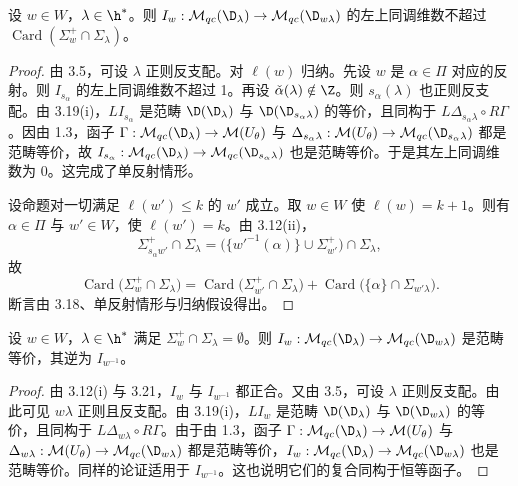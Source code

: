 \begin{theorem}\label{thm:03.3.21}
设 $w\in W$，$\lambda\in\h^*$。则 $I_w:\mathcal{M}_{qc}(\D_\lambda)\to\mathcal{M}_{qc}(\D_{w\lambda})$ 的左上同调维数不超过 $\operatorname{Card}(\Sigma^+_w\cap\Sigma_\lambda)$。
\end{theorem}

\begin{proof}
由 3.5，可设 $\lambda$ 正则反支配。对 $\ell(w)$ 归纳。先设 $w$ 是 $\alpha\in\Pi$ 对应的反射。则 $I_{s_\alpha}$ 的左上同调维数不超过 1。再设 $\check\alpha(\lambda)\notin\Z$。则 $s_\alpha(\lambda)$ 也正则反支配。由 3.19(i)，$LI_{s_\alpha}$ 是范畴 $\D(\D_\lambda)$ 与 $\D(\D_{s_\alpha\lambda})$ 的等价，且同构于 $L\Delta_{s_\alpha\lambda}\circ R\Gamma$。因由 1.3，函子 $\Gamma:\mathcal{M}_{qc}(\D_\lambda)\to\mathcal{M}(U_\theta)$ 与 $\Delta_{s_\alpha\lambda}:\mathcal{M}(U_\theta)\to\mathcal{M}_{qc}(\D_{s_\alpha\lambda})$ 都是范畴等价，故 $I_{s_\alpha}:\mathcal{M}_{qc}(\D_\lambda)\to\mathcal{M}_{qc}(\D_{s_\alpha\lambda})$ 也是范畴等价。于是其左上同调维数为 0。这完成了单反射情形。

设命题对一切满足 $\ell(w')\le k$ 的 $w'$ 成立。取 $w\in W$ 使 $\ell(w)=k+1$。则有 $\alpha\in\Pi$ 与 $w'\in W$，使 $\ell(w')=k$。由 3.12(ii)，
$$\Sigma^+_{s_\alpha w'}\cap\Sigma_\lambda=\bigl(\{w'^{-1}(\alpha)\}\cup\Sigma^+_{w'}\bigr)\cap\Sigma_\lambda,$$
故
$$\operatorname{Card}\bigl(\Sigma^+_w\cap\Sigma_\lambda\bigr)=\operatorname{Card}\bigl(\Sigma^+_{w'}\cap\Sigma_\lambda\bigr)+\operatorname{Card}\bigl(\{\alpha\}\cap\Sigma_{w'\lambda}\bigr).$$
断言由 3.18、单反射情形与归纳假设得出。
\end{proof}

\begin{corollary}\label{cor:03.3.22}
设 $w\in W$，$\lambda\in\h^*$ 满足 $\Sigma^+_w\cap\Sigma_\lambda=\emptyset$。则 $I_w:\mathcal{M}_{qc}(\D_\lambda)\to\mathcal{M}_{qc}(\D_{w\lambda})$ 是范畴等价，其逆为 $I_{w^{-1}}$。
\end{corollary}

\begin{proof}
由 3.12(i) 与 3.21，$I_w$ 与 $I_{w^{-1}}$ 都正合。又由 3.5，可设 $\lambda$ 正则反支配。由此可见 $w\lambda$ 正则且反支配。由 3.19(i)，$LI_w$ 是范畴 $\D(\D_\lambda)$ 与 $\D(\D_{w\lambda})$ 的等价，且同构于 $L\Delta_{w\lambda}\circ R\Gamma$。由于由 1.3，函子 $\Gamma:\mathcal{M}_{qc}(\D_\lambda)\to\mathcal{M}(U_\theta)$ 与 $\Delta_{w\lambda}:\mathcal{M}(U_\theta)\to\mathcal{M}_{qc}(\D_{w\lambda})$ 都是范畴等价，$I_w:\mathcal{M}_{qc}(\D_\lambda)\to\mathcal{M}_{qc}(\D_{w\lambda})$ 也是范畴等价。同样的论证适用于 $I_{w^{-1}}$。这也说明它们的复合同构于恒等函子。
\end{proof}

